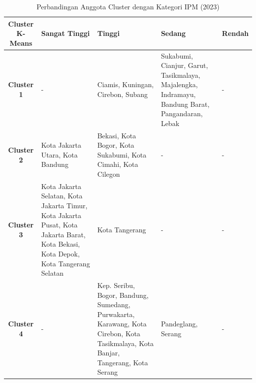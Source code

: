\begin{table}[H]
\centering
\caption{Perbandingan Anggota Cluster dengan Kategori IPM (2023)} \label{tab:ipm_cross_2023}
\begin{tabular}{|c|p{2cm}|p{2cm}|p{2cm}|p{2cm}|}
\hline
\textbf{Cluster K-Means} & \textbf{Sangat Tinggi} & \textbf{Tinggi} & \textbf{Sedang} & \textbf{Rendah} \\ \hline
\textbf{Cluster 1} & - & Ciamis, Kuningan, Cirebon, Subang & Sukabumi, Cianjur, Garut, Tasikmalaya, Majalengka, Indramayu, Bandung Barat, Pangandaran, Lebak & - \\ \hline
\textbf{Cluster 2} & Kota Jakarta Utara, Kota Bandung & Bekasi, Kota Bogor, Kota Sukabumi, Kota Cimahi, Kota Cilegon & - & - \\ \hline
\textbf{Cluster 3} & Kota Jakarta Selatan, Kota Jakarta Timur, Kota Jakarta Pusat, Kota Jakarta Barat, Kota Bekasi, Kota Depok, Kota Tangerang Selatan & Kota Tangerang & - & - \\ \hline
\textbf{Cluster 4} & - & Kep. Seribu, Bogor, Bandung, Sumedang, Purwakarta, Karawang, Kota Cirebon, Kota Tasikmalaya, Kota Banjar, Tangerang, Kota Serang & Pandeglang, Serang & - \\ \hline
\end{tabular}
\end{table}